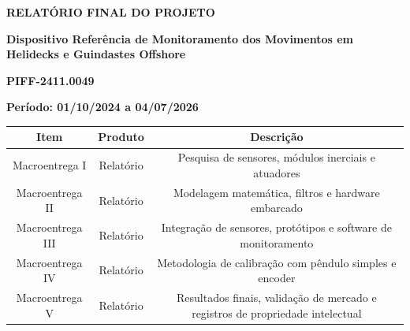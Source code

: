 \begin{center}
    \LARGE
    \textbf{RELATÓRIO FINAL DO PROJETO}

    \vspace{0.6cm}
    \normalsize

    \begin{minipage}{.90\linewidth}
        \centering
        \textbf{
            Dispositivo Referência de Monitoramento dos Movimentos em Helidecks e Guindastes Offshore
        }

        \vspace{.6cm}
        \textbf{PIFF-2411.0049}
        \normalsize
    \end{minipage}

    \vspace{1.2cm}

    \begin{flushleft}
     \phantom{a.}\textbf{Período: 01/10/2024 a 04/07/2026}
    \end{flushleft}

    \begin{center}
    \small
    \begin{tabular}{|c|c|c|}
    \hline
        Item & Produto & Descrição \\
    \hline
        \multicolumn{1}{|m{5cm}|}{
            Macroentrega I
        }
        & \multicolumn{1}{m{3.5cm}|}{
            \centering
            Relatório
        }
        & \multicolumn{1}{m{6.5cm}|}{
            Pesquisa de sensores, módulos inerciais e atuadores
        }\\
    \hline
        \multicolumn{1}{|m{5cm}|}{
            Macroentrega II
        }
        & \multicolumn{1}{m{3.5cm}|}{
            \centering
            Relatório
        }
        & \multicolumn{1}{m{6.5cm}|}{
            Modelagem matemática, filtros e hardware embarcado
        }\\
    \hline
        \multicolumn{1}{|m{5cm}|}{
            Macroentrega III
        }
        & \multicolumn{1}{m{3.5cm}|}{
            \centering
            Relatório
        }
        & \multicolumn{1}{m{6.5cm}|}{
            Integração de sensores, protótipos e software de monitoramento
        }\\
    \hline
        \multicolumn{1}{|m{5cm}|}{
            Macroentrega IV
        }
        & \multicolumn{1}{m{3.5cm}|}{
            \centering
            Relatório
        }
        & \multicolumn{1}{m{6.5cm}|}{
            Metodologia de calibração com pêndulo simples e encoder
        }\\
    \hline
        \multicolumn{1}{|m{5cm}|}{
            Macroentrega V
        }
        & \multicolumn{1}{m{3.5cm}|}{
            \centering
            Relatório
        }
        & \multicolumn{1}{m{6.5cm}|}{
            Resultados finais, validação de mercado e registros de propriedade intelectual
        }\\
    \hline
    \end{tabular}
\end{center}


\end{center}
